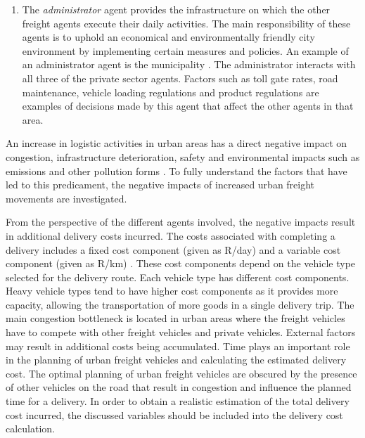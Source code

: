 \begin{enumerate}
    \item The \textit{administrator} agent provides the infrastructure on which the other freight agents execute their daily activities. The main responsibility of these agents is to uphold an economical and environmentally friendly city environment by implementing certain measures and policies. An example of an administrator agent is the municipality \citep{anand2014ontology}. The administrator interacts with all three of the private sector agents. Factors such as toll gate rates, road maintenance, vehicle loading regulations and product regulations are examples of decisions made by this agent that affect the other agents in that area.
\end{enumerate}


An increase in logistic activities in urban areas has a direct negative impact on congestion, infrastructure deterioration, safety and environmental impacts such as emissions and other pollution forms \citep{lindawati2014collaboration,savelsbergh201650th, bean2018, gonzalez2012defining,savelsbergh201650th}.  To fully understand the factors that have led to this predicament, the negative impacts of increased urban freight movements are investigated. \par

From the perspective of the different agents involved, the negative impacts result in additional delivery costs incurred. The costs associated with completing a delivery includes a fixed cost component (given as R/day) and a variable cost component (given as R/km) \citep{bean2018}. These cost components depend on the vehicle type selected for the delivery route. Each vehicle type has different cost components. Heavy vehicle types tend to have higher cost components as it provides more capacity, allowing the transportation of more goods in a single delivery trip. The main congestion bottleneck is located in urban areas where the freight vehicles have to compete with other freight vehicles and private vehicles. External factors may result in additional costs being accumulated. Time plays an important role in the planning of urban freight vehicles and calculating the estimated delivery cost. The optimal planning of urban freight vehicles are obscured by the presence of other vehicles on the road that result in congestion and influence the planned time for a delivery. In order to obtain a realistic estimation of the total delivery cost incurred, the discussed variables should be included into the delivery cost calculation. \par

